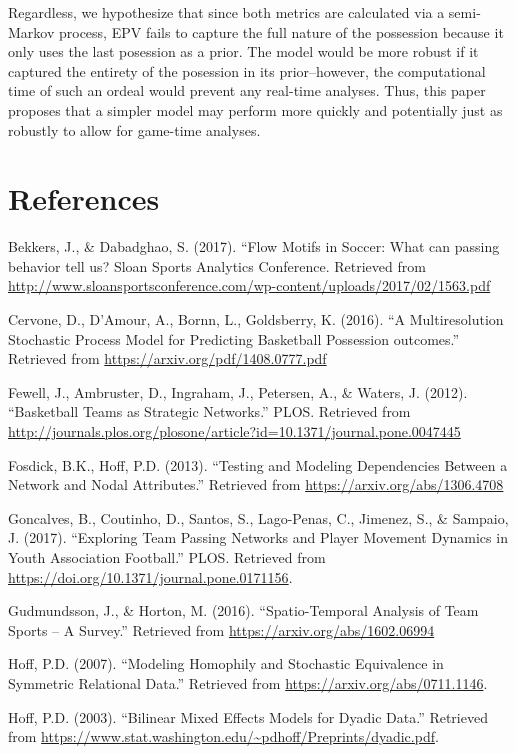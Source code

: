 \documentclass[12pt,twoside]{dukestatscithesis}
\theoremstyle{definition}
\theoremstyle{definition}
\theoremstyle{definition}
\theoremstyle{remark}
\begin{document}
Regardless, we hypothesize that since both metrics are calculated via a
semi-Markov process, EPV fails to capture the full nature of the
possession because it only uses the last posession as a prior. The model
would be more robust if it captured the entirety of the posession in its
prior--however, the computational time of such an ordeal would prevent
any real-time analyses. Thus, this paper proposes that a simpler model
may perform more quickly and potentially just as robustly to allow for
game-time analyses.

\backmatter

\chapter*{References}\label{references}

Bekkers, J., \& Dabadghao, S. (2017). ``Flow Motifs in Soccer: What can
passing behavior tell us? Sloan Sports Analytics Conference. Retrieved
from
\url{http://www.sloansportsconference.com/wp-content/uploads/2017/02/1563.pdf}

Cervone, D., D'Amour, A., Bornn, L., Goldsberry, K. (2016). ``A
Multiresolution Stochastic Process Model for Predicting Basketball
Possession outcomes.'' Retrieved from
\url{https://arxiv.org/pdf/1408.0777.pdf}

Fewell, J., Ambruster, D., Ingraham, J., Petersen, A., \& Waters, J.
(2012). ``Basketball Teams as Strategic Networks.'' PLOS. Retrieved from
\url{http://journals.plos.org/plosone/article?id=10.1371/journal.pone.0047445}

Fosdick, B.K., Hoff, P.D. (2013). ``Testing and Modeling Dependencies
Between a Network and Nodal Attributes.'' Retrieved from
\url{https://arxiv.org/abs/1306.4708}

Goncalves, B., Coutinho, D., Santos, S., Lago-Penas, C., Jimenez, S., \&
Sampaio, J. (2017). ``Exploring Team Passing Networks and Player
Movement Dynamics in Youth Association Football.'' PLOS. Retrieved from
\url{https://doi.org/10.1371/journal.pone.0171156}.

Gudmundsson, J., \& Horton, M. (2016). ``Spatio-Temporal Analysis of
Team Sports -- A Survey.'' Retrieved from
\url{https://arxiv.org/abs/1602.06994}

Hoff, P.D. (2007). ``Modeling Homophily and Stochastic Equivalence in
Symmetric Relational Data.'' Retrieved from
\url{https://arxiv.org/abs/0711.1146}.

Hoff, P.D. (2003). ``Bilinear Mixed Effects Models for Dyadic Data.''
Retrieved from
\url{https://www.stat.washington.edu/~pdhoff/Preprints/dyadic.pdf}.
\end{document}
